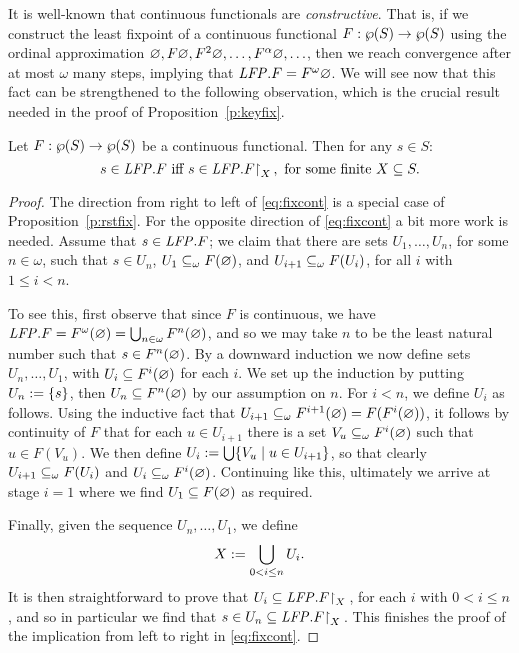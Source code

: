 It is well-known that continuous functionals are \emph{constructive}.
That is, if we construct the least fixpoint of a continuous functional $F: 
\wp(S) \to \wp(S)$ using the ordinal approximation $\varnothing, F\varnothing, F^2\varnothing, 
\ldots, F^{\alpha}\varnothing, \ldots$, then we reach convergence after at most $\omega$
many steps, implying that $\mathit{LFP}. F = F^{\omega}\varnothing$.
We will see now that this fact can be strengthened to the following observation,
which is the crucial result needed in the proof of Proposition~\ref{p:keyfix}.

\begin{theorem}
\label{t:fixcont}
Let $F: \wp(S)\to \wp(S)$ be a continuous functional.
Then for any $s \in S$:
\begin{equation}
\label{eq:fixcont}
s \in \LFP. F \text{ iff }
s \in \LFP.F\rst{X}, \text{ for some finite } X \subseteq S.
\end{equation}
\end{theorem}

\begin{proof}
The direction from right to left of \eqref{eq:fixcont} is a special case of 
Proposition~\ref{p:rstfix}.
For the opposite direction of \eqref{eq:fixcont} a bit more work is needed.
Assume that $s \in \mathit{LFP}. F$; we claim that there are sets $U_{1},\ldots,U_{n}$,
for some $n \in \omega$, such that $s \in U_{n}$, $U_{1} \subseteq_{\omega} F(\varnothing)$,
and $U_{i+1} \subseteq_{\omega} F(U_{i})$, for all $i$ with $1 \leq i < n$.

To see this, first observe that since $F$ is continuous, we have $\mathit{LFP}. F = 
F^{\omega}(\varnothing) = \bigcup_{n\in\omega}F^{n}(\varnothing)$, and so we may take $n$ to
be the least natural number such that $s \in F^{n}(\varnothing)$.
By a downward induction we now define sets $U_{n},\ldots,U_{1}$, with $U_{i} 
\subseteq F^{i}(\varnothing)$ for each $i$. 
We set up the induction by putting $U_{n} \mathrel{:=} \{ s \}$, then $U_{n}
\subseteq F^{n}(\varnothing)$ by our assumption on $n$.
For $i<n$, we define $U_{i}$ as follows.
Using the inductive fact that $U_{i+1} \subseteq_{\omega} F^{i+1}(\varnothing) = 
F(F^{i}(\varnothing))$, it follows by continuity of $F$ that for each $u \in U_{i+1}$
there is a set $V_{u} \subseteq_{\omega} F^{i}(\varnothing)$ such that $u \in F(V_{u})$.
We then define $U_{i} \mathrel{:=} \bigcup \{ V_{u} \mid u \in U_{i+1} \}$,
so that clearly $U_{i+1} \subseteq_{\omega} F(U_{i})$ and $U_{i} \subseteq_{\omega}
F^{i}(\varnothing)$.
Continuing like this, ultimately we arrive at stage $i=1$ where we find
$U_{1} \subseteq F(\varnothing)$ as required.

Finally, given the sequence $U_{n},\ldots,U_{1}$, we define 
\[
X \mathrel{:=}  \bigcup_{0<i\leq n} U_{i}.
\]
It is then straightforward to prove that $U_{i} \subseteq \mathit{LFP}. F{\upharpoonright}_{X}\,$, for each 
$i$ with $0<i\leq n$, and so in particular we find that $s \in U_{n} \subseteq \mathit{LFP}.
F{\upharpoonright}_{X}\,$.
This finishes the proof of the implication from left to right in 
\eqref{eq:fixcont}.
\end{proof}

